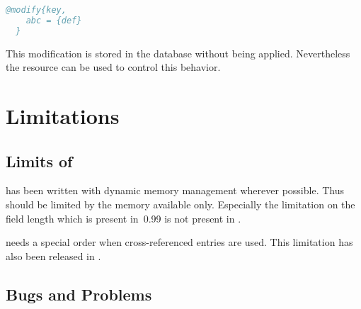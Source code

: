 \documentclass[11pt,a4paper]{scrbook}
\begin{document}
\begin{lstlisting}[language=BibTeX]
  @modify{key,
    abc = {def}
  }
\end{lstlisting}

This modification is stored in the database without being applied.
Nevertheless the resource  can be used to control this
behavior.


\begin{Summary}
\end{Summary}


\chapter{Limitations}

\section{Limits of \BibTool}

\BibTool{} has been written with dynamic memory management wherever possible.
Thus \BibTool{} should be limited by the memory available only. Especially the
limitation on the field length which is present in \BibTeX\,0.99 is not
present in \BibTool.

\BibTeX{} needs a special order when cross-referenced entries are used. This
limitation has also been released in \BibTool.


\section{Bugs and Problems}
\end{document}
